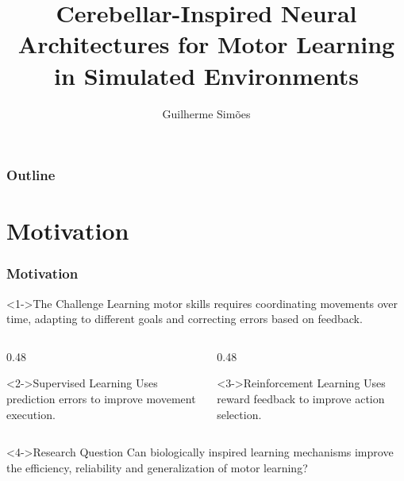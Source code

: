 \documentclass{beamer}
\title{Cerebellar-Inspired Neural Architectures for Motor Learning in Simulated Environments}
\author{Guilherme Simões}
\institute
{
  NOVA FCT\\
}
\begin{document}
  \begin{frame}
    \titlepage
  \end{frame}

  \begin{frame}
    \frametitle{Outline}
    \small
    \tableofcontents[sections={1-20},hideallsubsections]
  \end{frame}


  \section{Motivation}
    \begin{frame}
      \frametitle{Motivation}
      \begin{block}<1->{The Challenge}
          Learning motor skills requires coordinating movements over
          time, adapting to different goals and correcting errors
          based on feedback.
      \end{block}

      \vspace{0.3cm}

      \begin{columns}[T]
          \begin{column}{0.48\textwidth}
              \begin{block}<2->{Supervised Learning}
                  Uses prediction errors to improve movement execution.
              \end{block}
          \end{column}

          \begin{column}{0.48\textwidth}
              \begin{block}<3->{Reinforcement Learning}
                  Uses reward feedback to improve action selection.
              \end{block}
          \end{column}
      \end{columns}

      \vspace{0.3cm}

      \begin{block}<4->{Research Question}
          Can biologically inspired learning mechanisms improve
          the efficiency, reliability and generalization of
          motor learning?
      \end{block}
  \end{frame}

\end{document}
